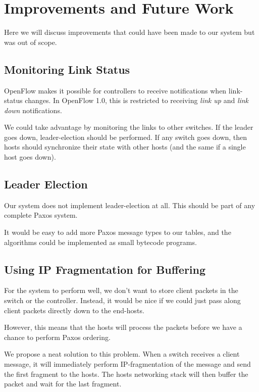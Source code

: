 \chapter{Improvements and Future Work}

Here we will discuss improvements that could have been made to our system
but was out of scope.

\section{Monitoring Link Status}

OpenFlow makes it possible for controllers to receive notifications when
link-status changes.  In OpenFlow 1.0, this is restricted
to receiving \textit{link up} and \textit{link down}
notifications.

We could take advantage by monitoring the links to other switches.
If the leader goes down, leader-election should be performed.
If any switch goes down, then hosts should synchronize their state with
other hosts (and the same if a single host goes down).

\section{Leader Election}

Our system does not implement
leader-election at all.
This should be part of any complete Paxos system.

It would be easy to add more Paxos message types to our tables, and the
algorithms could be implemented as small bytecode programs.

\section{Using IP Fragmentation for Buffering}

For the system to perform well, we don't want to store client packets in the
switch or the controller.  Instead, it would be nice if we could just pass
along client packets directly down to the end-hosts.

However, this means that the hosts will process the packets before we have a
chance to perform Paxos ordering.

We propose a neat solution to this problem.  When a switch receives a client
message, it will immediately perform IP-fragmentation of the message and
send the first fragment to the hosts.  The hosts networking stack will then
buffer the packet and wait for the last fragment.

